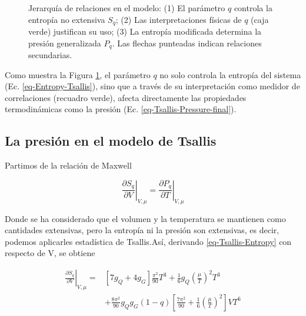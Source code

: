 \begin{figure}[h]
    \caption[Diagrama de relaciones Tsallis]{Jerarquía de relaciones en el modelo: (1) El parámetro $q$ controla la entropía no extensiva $S_q$; (2) Las interpretaciones físicas de $q$ (caja verde) justifican su uso; (3) La entropía modificada determina la presión generalizada $P_q$. Las flechas punteadas indican relaciones secundarias.}
    \label{fig:Tsallis-flow-complete}
\end{figure}

Como muestra la Figura \ref{fig:Tsallis-flow-complete}, el parámetro $q$ no solo controla la entropía del sistema (Ec. \ref{eq-Entropy-Tsallis}), sino que a través de su interpretación como medidor de correlaciones (recuadro verde), afecta directamente las propiedades termodinámicas como la presión (Ec. \ref{eq-Tsallis-Pressure-final}).

\subsection{La presión en el modelo de Tsallis}

Partimos de la relación de Maxwell

\begin{equation}\label{eq-Max-rel-S-P}
\left. \frac{\partial{S}_{q}}{\partial V} \right|_{V,\mu} = \left. \frac{\partial{P}_{q}}{\partial T} \right|_{V,\mu}
\end{equation}

Donde se ha considerado que el volumen y la temperatura se mantienen como cantidades extensivas, pero la entropía ni la presión son extensivas, es decir, podemos aplicarles estadística de Tsallis.Así, derivando \eqref{eq-Tsallis-Entropy} con respecto de V, se obtiene 

\begin{equation}
\begin{split}
\left. \frac{\partial{S}_{q}}{\partial V} \right|_{V,\mu}  =  & \left[ 7{g}_{Q} + 4 {g}_{G}\right] \frac{{\pi}^{2}}{90} {T}^{3} + \frac{1}{6} {g}_{Q} \left(\frac{\mu}{T} \right)^{2} {T}^{3}\\
& + \frac{8{\pi}^{2}}{90} {g}_{Q}{g}_{G} (1-q) \left[ \frac{7{\pi}^{2}}{90} + \frac{1}{6} \left(\frac{\mu}{T} \right)^{2} \right]V{T}^{6}
\end{split}
\end{equation}


